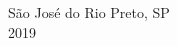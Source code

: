 \begin{center}
	\fontsize{14}{\baselineskip} \selectfont
	\vspace*{\fill}
	São José do Rio Preto, SP \\ \vspace{1.0pt}  
	2019
\end{center}